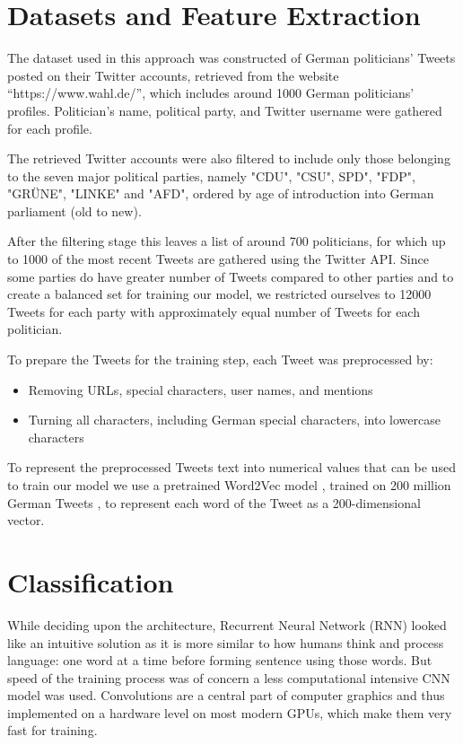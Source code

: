 \documentclass[10pt, oneside]{article}
\begin{document}
\begin{multicols}{2}
\section{Datasets and Feature Extraction} 

The dataset used in this approach was constructed of German politicians' Tweets posted on their Twitter accounts, retrieved from the website “https://www.wahl.de/”, which includes around 1000 German politicians' profiles. Politician’s name, political party, and Twitter username were gathered for each profile.
 
The retrieved Twitter accounts were also filtered to include only those belonging to the seven major political parties, namely "CDU", "CSU", SPD", "FDP", "GRÜNE", "LINKE" and "AFD", ordered by age of introduction into German parliament (old to new). 

After the filtering stage this leaves a list of around 700 politicians, for which up to 1000 of the most recent Tweets are  gathered using the Twitter API. Since some parties do have greater number of Tweets compared to other parties and to create a balanced set for training our model, we restricted ourselves to 12000 Tweets for each party with approximately equal number of Tweets for each politician.    

To prepare the Tweets for the training step, each Tweet was preprocessed by:
\begin{itemize}
\item Removing URLs, special characters, user names, and mentions
\item Turning all characters, including German special characters, into lowercase characters
\end{itemize}

To represent the preprocessed Tweets text into numerical values that can be used to train our model we use a pretrained Word2Vec model \cite{DBLP:journals/corr/abs-1301-3781}, trained on 200 million German Tweets \cite{cieliebak2017twitter},  to represent each word of the Tweet as a  200-dimensional vector.


\section{Classification}

While deciding upon the architecture, Recurrent Neural Network (RNN) looked like an intuitive solution as it is more similar to how humans think and process language: one word at a time before forming sentence using those words. But speed of the training process was of concern a less computational intensive CNN model was used. Convolutions are a central part of computer graphics and thus implemented on a hardware level on most modern GPUs, which make them very fast for training.


\end{multicols}
\end{document}
